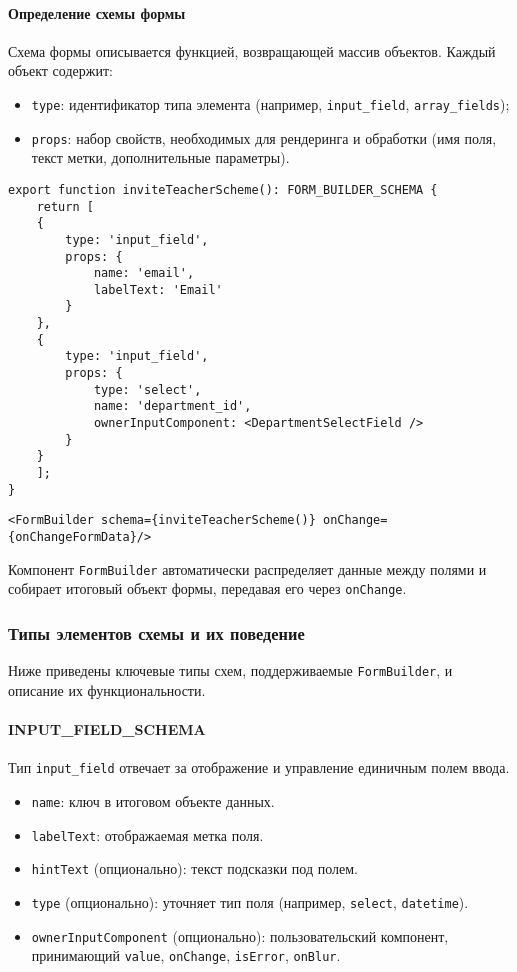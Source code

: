 \paragraph{Определение схемы формы}
Схема формы описывается функцией, возвращающей массив объектов. Каждый объект содержит:
\begin{itemize}
	\item \texttt{type}: идентификатор типа элемента (например, \texttt{input\_field}, \texttt{array\_fields});
	\item \texttt{props}: набор свойств, необходимых для рендеринга и обработки (имя поля, текст метки, дополнительные параметры).
\end{itemize}

\begin{lstlisting}[caption=Пример описания схемы формы]
export function inviteTeacherScheme(): FORM_BUILDER_SCHEMA {
	return [
	{
		type: 'input_field',
		props: {
			name: 'email',
			labelText: 'Email'
		}
	},
	{
		type: 'input_field',
		props: {
			type: 'select',
			name: 'department_id',
			ownerInputComponent: <DepartmentSelectField />
		}
	}
	];
}
\end{lstlisting}

\begin{lstlisting}[caption=Использование \texttt{FormBuilder}]
<FormBuilder schema={inviteTeacherScheme()} onChange={onChangeFormData}/>
\end{lstlisting}

Компонент \texttt{FormBuilder} автоматически распределяет данные между полями и собирает итоговый объект формы, передавая его через \texttt{onChange}.

\subsubsection{Типы элементов схемы и их поведение}
Ниже приведены ключевые типы схем, поддерживаемые \texttt{FormBuilder}, и описание их функциональности.

\paragraph{INPUT\_FIELD\_SCHEMA}
Тип \texttt{input\_field} отвечает за отображение и управление единичным полем ввода.
\begin{itemize}
	\item \texttt{name}: ключ в итоговом объекте данных.
	\item \texttt{labelText}: отображаемая метка поля.
	\item \texttt{hintText} (опционально): текст подсказки под полем.
	\item \texttt{type} (опционально): уточняет тип поля (например, \texttt{select}, \texttt{datetime}).
	\item \texttt{ownerInputComponent} (опционально): пользовательский компонент, принимающий \texttt{value}, \texttt{onChange}, \texttt{isError}, \texttt{onBlur}.
\end{itemize}

